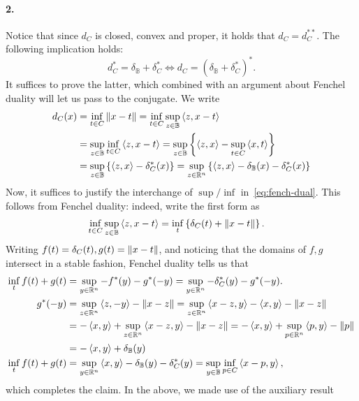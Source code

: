 \documentclass[10pt]{article}
\begin{document}
\paragraph{2.}
Notice that since $d_C$ is closed, convex and proper, it holds that $d_C =
d_C^{**}$. The following implication holds:
\[
	d_{C}^* = \delta_{\mathbb{B}} + \delta_{C}^* \Leftrightarrow
	d_{C} = \left( \delta_{\mathbb{B}} + \delta_{C}^* \right)^*.
\]
It suffices to prove the latter, which combined with an argument about Fenchel
duality will let us pass to the conjugate. We write
\begin{align}
	d_{C}(x) &= \inf_{t \in C} \left \| x - t \right \| =
		\inf_{t \in C} \sup_{z \in \mathbb{B}} \left\langle z, x - t \right\rangle \nonumber \\
		&= \sup_{z \in \mathbb{B}} \inf_{t \in C} \left\langle z, x - t \right\rangle
		 = \sup_{z \in \mathbb{B}} \left\{ \left\langle z, x \right\rangle - \sup_{t \in C} \left\langle x, t \right\rangle \right\}
		\label{eq:fench-dual} \\
		&= \sup_{z \in \mathbb{B}} \left\{ \left\langle z, x \right\rangle - \delta_{C}^*(x) \right\} =
		   \sup_{z \in \mathbb{R}^n} \left\{ \left\langle z, x \right\rangle - \delta_{\mathbb{B}}(x) -
		   \delta_C^*(x) \right\} \nonumber
\end{align}
Now, it suffices to justify the interchange of $\sup / \inf$
in~\cref{eq:fench-dual}. This follows from Fenchel duality: indeed, write the
first form as
\begin{align*}
	\inf_{t \in C} \sup_{z \in \mathbb{B}} \left\langle z, x - t \right\rangle &=
		\inf_{t} \left\{ \delta_{C}(t) + \left \| x - t \right \| \right\}.
\end{align*}
Writing $f(t) = \delta_{C}(t), g(t) = \left \| x - t \right \|$, and noticing that the
domains of $f, g$ intersect in a stable fashion, Fenchel duality tells us that
\begin{align*}
	\inf_{t} f(t) + g(t) &= \sup_{y \in \mathbb{R}^n} -f^*(y) - g^*(-y) =
		\sup_{y \in \mathbb{R}^n} -\delta_{C}^*(y) - g^*(-y). \\
	g^*(-y) &= \sup_{z \in \mathbb{R}^n} \left\langle z, -y \right\rangle - \left \| x - z \right \| =
		\sup_{z \in \mathbb{R}^n} \left\langle x - z, y \right\rangle - \left\langle x, y \right\rangle - \left \| x - z \right \| \\
		&= -\left\langle x, y \right\rangle + \sup_{z \in \mathbb{R}^n} \left\langle x - z, y \right\rangle - \left \| x - z \right \|
		 = -\left\langle x, y \right\rangle + \sup_{p \in \mathbb{R}^n} \left\langle p, y \right\rangle - \left \| p \right \| \\
		&= -\left\langle x, y \right\rangle + \delta_{\mathbb{B}}(y) \\
	\inf_t f(t) + g(t) &= \sup_{y \in \mathbb{R}^n} \left\langle x, y \right\rangle -
	\delta_{\mathbb{B}}(y) - \delta_{C}^*(y) = \sup_{y \in \mathbb{B}}
		\inf_{p \in C} \left\langle x - p, y \right\rangle,
\end{align*}
which completes the claim. In the above, we made use of the auxiliary result
\end{document}
